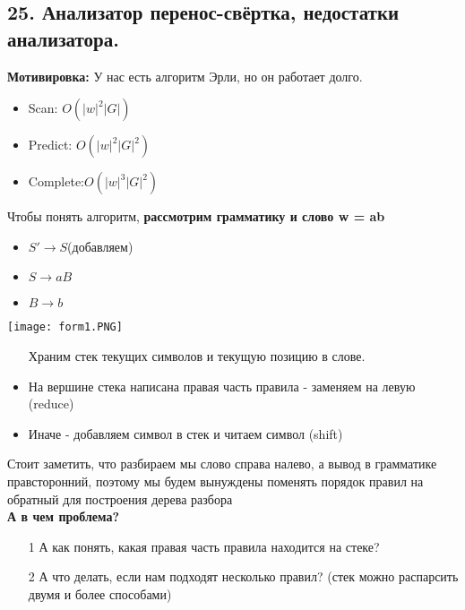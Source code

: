 \subsection{25. Анализатор перенос-свёртка, недостатки анализатора.}
\textbf{Мотивировка:} У нас есть алгоритм Эрли, но он работает долго.
\begin{itemize}
    \item Scan: $O(|w|^2|G|)$
 \item Predict: $O(|w|^2|G|^2)$
\item  Complete:$O(|w|^3|G|^2)$
\end{itemize}
Чтобы понять алгоритм, \textbf{рассмотрим грамматику и слово w = ab}\\
\begin{itemize}
    \item $S' \rightarrow S$(добавляем)
 \item $S \rightarrow aB$
 \item $B \rightarrow b$
\end{itemize}
\texttt{[image: form1.PNG]}\\
\begin{itemize}
    \item[] Храним стек текущих символов и текущую позицию в слове.

 \item На вершине стека написана правая часть правила - заменяем на левую (reduce)

 \item Иначе - добавляем символ в стек и читаем символ (shift)
\end{itemize} Стоит заметить, что разбираем мы слово справа налево, а вывод в грамматике правсторонний, поэтому мы будем вынуждены поменять порядок правил на обратный для построения дерева разбора
\\
\textbf{А в чем проблема?}
\begin{itemize}
    \item [1] А как понять, какая правая часть правила находится на стеке?
     \item [2] А что делать, если нам подходят несколько правил? (стек можно распарсить двумя и более способами) 
\end{itemize}